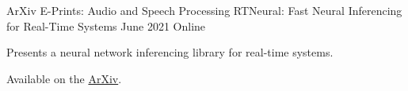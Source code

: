 \begin{cventries}


  \cventry
    {ArXiv E-Prints: Audio and Speech Processing} %
    {RTNeural: Fast Neural Inferencing for Real-Time Systems} %
    {June 2021} %
    {Online} %
    {
      \begin{cvitems} %
        \item {Presents a neural network inferencing library for real-time systems.}
        \item {Available on the \href{https://arxiv.org/pdf/2106.03037.pdf}{ArXiv}.}
      \end{cvitems}
    }



\end{cventries}
